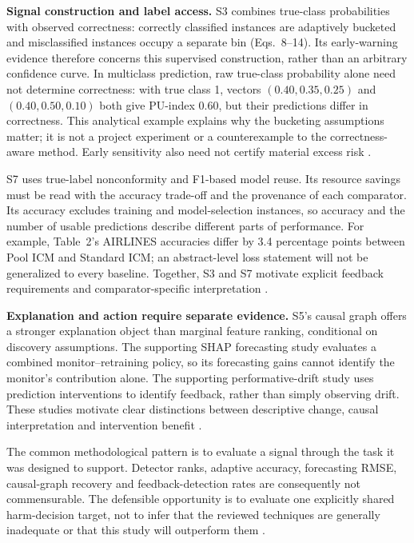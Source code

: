 \documentclass[11pt,a4paper]{article}
\begin{document}
\textbf{Signal construction and label access.} S3 combines true-class
probabilities with observed correctness: correctly classified instances are
adaptively bucketed and misclassified instances occupy a separate bin
(Eqs.~8--14). Its early-warning evidence therefore concerns this supervised
construction, rather than an arbitrary confidence curve. In multiclass
prediction, raw true-class probability alone need not determine correctness:
with true class 1, vectors $(0.40,0.35,0.25)$ and $(0.40,0.50,0.10)$ both
give PU-index 0.60, but their predictions differ in correctness. This analytical
example explains why the bucketing assumptions matter; it is not a project
experiment or a counterexample to the correctness-aware method. Early
sensitivity also need not certify material excess risk \cite{pudd}.

S7 uses true-label nonconformity and F1-based model reuse. Its resource savings
must be read with the accuracy trade-off and the provenance of each comparator.
Its accuracy excludes training and model-selection instances, so accuracy and
the number of usable predictions describe different parts of performance.
For example, Table~2's AIRLINES accuracies differ by 3.4 percentage points
between Pool ICM and Standard ICM; an abstract-level loss statement will not be
generalized to every baseline. Together, S3 and S7 motivate explicit feedback
requirements and comparator-specific interpretation \cite{conformal}.

\textbf{Explanation and action require separate evidence.} S5's causal graph
offers a stronger explanation object than marginal feature ranking, conditional
on discovery assumptions. The supporting SHAP forecasting study evaluates a combined monitor--retraining policy,
so its forecasting gains cannot identify the monitor's contribution alone.
The supporting performative-drift study uses prediction interventions to
identify feedback, rather than simply observing drift. These studies motivate clear distinctions between descriptive
change, causal interpretation and intervention benefit
\cite{causal,shapenergy,performative}.

The common methodological pattern is to evaluate a signal through the task it
was designed to support. Detector ranks, adaptive accuracy, forecasting RMSE,
causal-graph recovery and feedback-detection rates are consequently not
commensurable. The defensible opportunity is to evaluate one explicitly shared
harm-decision target, not to infer that the reviewed techniques are generally
inadequate or that this study will outperform them
\cite{cerqueira,window,pudd,causal,shapenergy,performative}.
\end{document}
